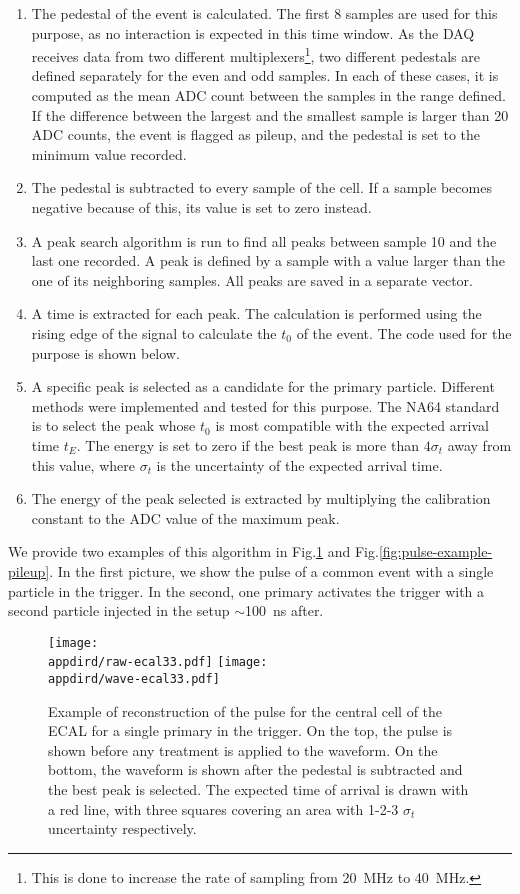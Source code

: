 \begin{enumerate}
\item The pedestal of the event is calculated. The first 8 samples are used for this purpose, as no interaction is expected in this time window. As the DAQ receives data from two different multiplexers\footnote{This is done to increase the rate of sampling from \SI{20}{\mega\hertz} to \SI{40}{\mega\hertz}.}, two different pedestals are defined separately for the even and odd samples. In each of these cases, it is computed as the mean ADC count between the samples in the range defined. If the difference between the largest and the smallest sample is larger than 20 ADC counts, the event is flagged as pileup, and the pedestal is set to the minimum value recorded.
\item The pedestal is subtracted to every sample of the cell. If a sample becomes negative because of this, its value is set to zero instead.
\item A peak search algorithm is run to find all peaks between sample 10 and the last one recorded. A peak is defined by a sample with a value larger than the one of its neighboring samples. All peaks are saved in a separate vector.
\item A time is extracted for each peak. The calculation is performed using the rising edge of the signal to calculate the $t_0$ of the event. The code used for the purpose is shown below.
\item A specific peak is selected as a candidate for the primary particle. Different methods were implemented and tested for this purpose. The NA64 standard is to select the peak whose $t_0$ is most compatible with the expected arrival time $t_E$. The energy is set to zero if the best peak is more than $4\sigma_t$ away from this value, where $\sigma_t$ is the uncertainty of the expected arrival time.
\item The energy of the peak selected is extracted by multiplying the calibration constant to the ADC value of the maximum peak.
\end{enumerate}

We provide two examples of this algorithm in Fig.\ref{fig:pulse-example} and Fig.\ref{fig:pulse-example-pileup}. In the first picture, we show the pulse of a common event with a single particle in the trigger. In the second, one primary activates the trigger with a second particle injected in the setup $\sim$\SI{100}{\nano\second} after.

\begin{figure}[bth!]
  \centering
  \texttt{[image: \\appdird/raw-ecal33.pdf]}
  \texttt{[image: \\appdird/wave-ecal33.pdf]}
  \caption[example of pulse reconstruction in NA64]{Example of reconstruction of the pulse for the central cell of the ECAL for a single primary in the trigger. On the top, the pulse is shown before any treatment is applied to the waveform. On the bottom, the waveform is shown after the pedestal is subtracted and the best peak is selected. The expected time of arrival is drawn with a red line, with three squares covering an area with 1-2-3 $\sigma_t$ uncertainty respectively.}
  \label{fig:pulse-example}
\end{figure}

